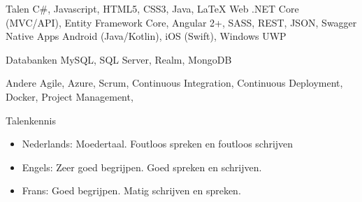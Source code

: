 


\begin{cvskills}


\cvskill
{Talen}
{C\#, Javascript, HTML5, CSS3, Java, LaTeX}
\cvskill
{Web}
{.NET Core (MVC/API), Entity Framework Core, Angular 2+, SASS, REST, JSON, Swagger}
\cvskill
{Native Apps}
{Android (Java/Kotlin), iOS (Swift), Windows UWP}

\cvskill
{Databanken}
{MySQL, SQL Server, Realm, MongoDB}

\cvskill
{Andere}
{Agile, Azure, Scrum, Continuous Integration, Continuous Deployment, Docker, Project Management,}

\cvskill
{Talenkennis} %
{
\begin{itemize}
\item {Nederlands: Moedertaal. Foutloos spreken en foutloos schrijven }
\item Engels: Zeer goed begrijpen. Goed spreken en schrijven.
\item Frans: Goed begrijpen. Matig schrijven en spreken.
\end{itemize}
} %


\end{cvskills}